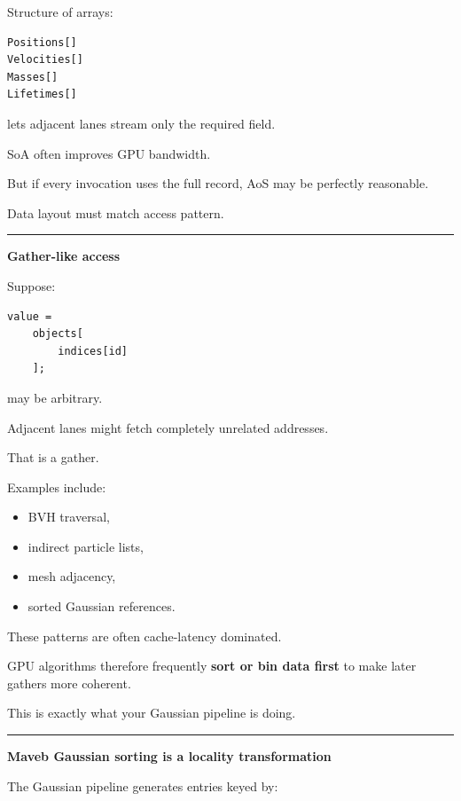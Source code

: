 Structure of arrays:

\protect{}\label{atbpdt}%
\begin{verbatim}
Positions[]
Velocities[]
Masses[]
Lifetimes[]
\end{verbatim}

lets adjacent lanes stream only the required field.

SoA often improves GPU bandwidth.

But if every invocation uses the full record, AoS may be perfectly reasonable.

Data layout must match access pattern.

\begin{center}\rule{0.5\linewidth}{0.5pt}\end{center}

\textbf{Gather-like access}

Suppose:

\protect{}\label{yx7r08}%
\begin{verbatim}
value =
    objects[
        indices[id]
    ];
\end{verbatim}

 may be arbitrary.

Adjacent lanes might fetch completely unrelated addresses.

That is a gather.

Examples include:

\begin{itemize}
\tightlist
\item
  BVH traversal,
\item
  indirect particle lists,
\item
  mesh adjacency,
\item
  sorted Gaussian references.
\end{itemize}

These patterns are often cache-latency dominated.

GPU algorithms therefore frequently \textbf{sort or bin data first} to make later gathers more coherent.

This is exactly what your Gaussian pipeline is doing.

\begin{center}\rule{0.5\linewidth}{0.5pt}\end{center}

\textbf{Maveb Gaussian sorting is a locality transformation}

The Gaussian pipeline generates entries keyed by:

